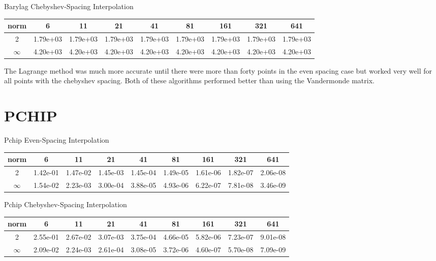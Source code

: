 \documentclass{article}
\begin{document}
Barylag Chebyshev-Spacing Interpolation
\begin{center}
\begin{tabular}{| c | c | c | c | c | c | c | c | c |}
\hline norm & 6 & 11 & 21 & 41 & 81 & 161 & 321 & 641 \\ \hline \hline 
2 & 1.79e+03 & 1.79e+03 &  1.79e+03 & 1.79e+03 &  1.79e+03 & 1.79e+03 &  1.79e+03 & 1.79e+03 \\ \hline 
$\infty$ & 4.20e+03 & 4.20e+03 &  4.20e+03 & 4.20e+03 &  4.20e+03 & 4.20e+03 &  4.20e+03 & 4.20e+03 \\ \hline 
\end{tabular}
\end{center}

The Lagrange method was much more accurate until there were more than forty points in the even spacing case but worked very well for all points with the chebyshev spacing. Both of these algorithms performed better than using the Vandermonde matrix.

\section{PCHIP}


Pchip Even-Spacing Interpolation
\begin{center}
\begin{tabular}{| c | c | c | c | c | c | c | c | c |}
\hline norm & 6 & 11 & 21 & 41 & 81 & 161 & 321 & 641 \\ \hline \hline 
2 & 1.42e-01 & 1.47e-02 &  1.45e-03 & 1.45e-04 &  1.49e-05 & 1.61e-06 &  1.82e-07 & 2.06e-08 \\ \hline 
$\infty$ & 1.54e-02 & 2.23e-03 &  3.00e-04 & 3.88e-05 &  4.93e-06 & 6.22e-07 &  7.81e-08 & 3.46e-09 \\ \hline 
\end{tabular}
\end{center}

Pchip Chebyshev-Spacing Interpolation
\begin{center}
\begin{tabular}{| c | c | c | c | c | c | c | c | c |}
\hline norm & 6 & 11 & 21 & 41 & 81 & 161 & 321 & 641 \\ \hline \hline 
2 & 2.55e-01 & 2.67e-02 &  3.07e-03 & 3.75e-04 &  4.66e-05 & 5.82e-06 &  7.23e-07 & 9.01e-08 \\ \hline 
$\infty$ & 2.09e-02 & 2.24e-03 &  2.61e-04 & 3.08e-05 &  3.72e-06 & 4.60e-07 &  5.70e-08 & 7.09e-09 \\ \hline 
\end{tabular}
\end{center}
\end{document}
